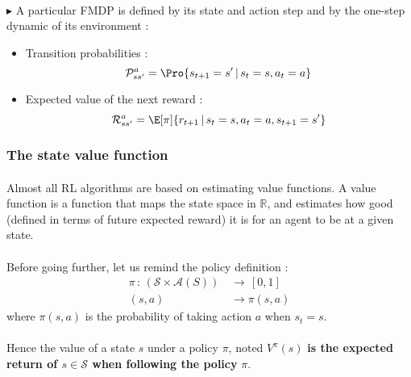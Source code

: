 \documentclass[a4paper]{article}
\begin{document}
{		\paragraph{} $\blacktriangleright$ A particular FMDP is defined by its state and action step and by the one-step dynamic of its environment : 
		\begin{itemize}
			\item Transition probabilities : 
				\begin{equation}
					\mathcal{P}_{ss'}^a = \Pro{s_{t+1}=s' \, \vert \, s_t = s, a_t=a}
				\end{equation}
			\item Expected value of the next reward : 
				\begin{equation}
					\mathcal{R}_{ss'}^a = \E[\pi]{ r_{t+1} \, \vert \, s_t=s, a_t=a, s_{t+1}=s'}
				\end{equation}
		\end{itemize}
		
		\subsubsection{The state value function}
		{
			\paragraph{} Almost all RL algorithms are based on estimating value functions. A value function is a function that maps the state space in $\mathbb{R}$, and estimates how good (defined in terms of future expected reward) it is for an agent to be at a given state. 
			
			\paragraph{} Before going further, let us remind the policy definition : 
			\begin{equation}
				\begin{aligned}
					\pi \, : \, (\mathcal{S}\times \mathcal{A}(S)) \, &\to \, [0,1] \\
							(s,a) &\to \pi(s,a)
				\end{aligned}
			\end{equation} 
			where $\pi(s,a)$ is the probability of taking action $a$ when $s_t=s$. 
			
			\paragraph{} Hence the value of a state $s$ under a policy $\pi$, noted $V^\pi(s)$ \textbf{is the expected return of $s\in\mathcal{S}$ when following the policy} $\pi$. 
			\vspace{10pt}
			
}}
\end{document}
